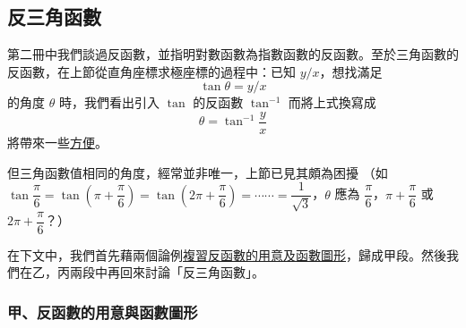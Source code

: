 \subsection{反三角函數}\label{sec:b5s-1-2}

第二冊中我們談過反函數，並指明對數函數為指數函數的反函數。至於三角函數的反函數，在上節從直角座標求極座標的過程中：已知 $y/x$，想找滿足
\[
\tan \theta = y/x
\]
的角度 $\theta$ 時，我們看出引入 $\tan$ 的反函數 $\tan^{-1}$ 而將上式換寫成
\[
\theta = \tan^{-1} \frac{y}{x}
\]
將帶來一些\underline{方便}。

但三角函數值相同的角度，經常並非唯一，上節已見其頗為困擾
（如 $\tan \dfrac{\pi}{6} = \tan\left(\pi + \dfrac{\pi}{6}\right) = \tan\left(2\pi + \dfrac{\pi}{6}\right) = \cdots\cdots = \dfrac{1}{\sqrt{3}}$，$\theta$ 應為 $\dfrac{\pi}{6}$，$\pi + \dfrac{\pi}{6}$ 或 $2\pi + \dfrac{\pi}{6}$？）

在下文中，我們首先藉兩個論例\underline{複習反函數的用意及函數圖形}，歸成甲段。然後我們在乙，丙兩段中再回來討論「反三角函數」。

\subsubsection*{甲、反函數的用意與函數圖形}

